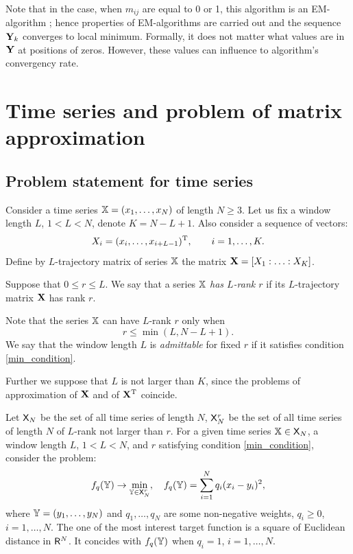 \documentclass[12pt,a4paper,fleqn,leqno]{article}
\begin{document}
Note that in the case, when $m_{ij}$ are equal to 0 or 1, this algorithm is an EM-algorithm \cite{Srebro2003};
hence properties of EM-algorithms are carried out and the sequence $\mathbf{Y}_k$ converges to local minimum. Formally, it does not matter what values are in $\mathbf{Y}$ at positions of zeros. However, these values can influence to algorithm's convergency rate.

\section{Time series and problem of matrix approximation}
\label{sec:ts_matrices}
\subsection{Problem statement for time series}
Consider a time series $\mathbb{X} = (x_1, \ldots, x_N)$ of length $N \ge 3$. Let us fix a window length $L$, $1 < L < N$, denote $K = N - L + 1$. Also consider a sequence of vectors:
\begin{equation}\label{l_lagged}
X_i = (x_i, \ldots, x_{i + L - 1})^{\mathrm{T}}, \qquad i = 1, \ldots, K.
\end{equation}
Define by $L$-trajectory matrix of series $\mathbb{X}$ the matrix $\mathbf{X} = [X_1:\ldots:X_K]$.

\begin{definition}
Suppose that $0 \le r \le L$. We say that a series $\mathbb{X}$ \emph{has $L$-rank $r$} if its $L$-trajectory matrix $\mathbf{X}$ has rank $r$.
\end{definition}

Note that the series $\mathbb{X}$ can have $L$-rank $r$ only when
\begin{equation}
r \le \min(L, N-L+1). \label{min_condition}
\end{equation}
We say that the window length $L$ is \emph{admittable} for fixed $r$ if it satisfies condition \eqref{min_condition}.

Further we suppose that $L$ is not larger than $K$, since the problems of approximation of $\mathbf{X}$ and of $\mathbf{X}^{\mathrm{T}}$ coincide.

Let $\mathsf{X}_N$ be the set of all time series of length $N$, $\mathsf{X}_N^r$ be the set of all time series of length $N$ of $L$-rank not larger than $r$. For a given time series $\mathbb{X} \in \mathsf{X}_N$, a window length $L$, $1 < L < N$, and $r$ satisfying condition \eqref{min_condition}, consider the problem:
\begin{equation} \label{L-rank_task}
f_q(\mathbb{Y}) \to \min_{\mathbb{Y} \in \mathsf{X}_N^r}, \quad f_q(\mathbb{Y}) = \sum \limits_{i=1}^N q_i(x_i - y_i)^2,
\end{equation}
where $\mathbb{Y} = (y_1, \ldots, y_N)$ and $q_1, \ldots, q_N$ are some non-negative weights,
$q_i \ge 0$, $i = 1, \ldots, N$. The one of the most interest target function is a square of Euclidean distance in $\mathsf{R}^N$. It concides with $f_q(\mathbb{Y})$ when $q_i = 1$, $i = 1, \ldots, N$.
\end{document}
